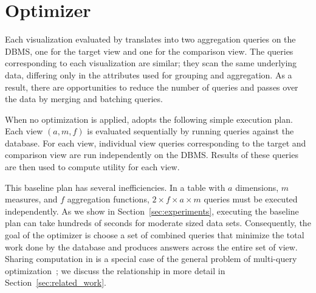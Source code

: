 \section{\SeeDB Optimizer}
\label{sec:optimizer}

Each visualization evaluated by \SeeDB translates into two 
aggregation queries on the DBMS, one for the target view and one for the comparison view.
The queries corresponding to each visualization are
 similar; they scan the same underlying data,  
differing only in the  attributes used for grouping and aggregation.
As a result, there are opportunities to reduce the number of queries and passes over the data 
by merging and batching queries.


 When no optimization is applied, \SeeDB adopts
the following simple execution plan.
Each view $(a, m, f)$ is evaluated sequentially by running queries against the database.
For each view, individual view queries corresponding to the
target and comparison view are run independently on the DBMS.
Results of these queries are then used to compute utility for each
view.

This baseline plan has several inefficiencies.
In a table with $a$ dimensions, $m$ measures, and $f$ aggregation functions, 
$2\times f \times a \times  m$ queries must be executed independently.  
As we show in Section~\ref{sec:experiments}, executing the baseline plan can take hundreds of seconds  for
moderate sized data sets.
Consequently, the goal of the optimizer is choose a set of combined queries that
minimize the total work done by the database and produces answers across the entire
set of view.
Sharing computation in \SeeDB is a special case of the general problem
of multi-query optimization~\cite{DBLP:journals/tods/Sellis88}; we discuss the 
relationship in more detail in Section~\ref{sec:related_work}.


